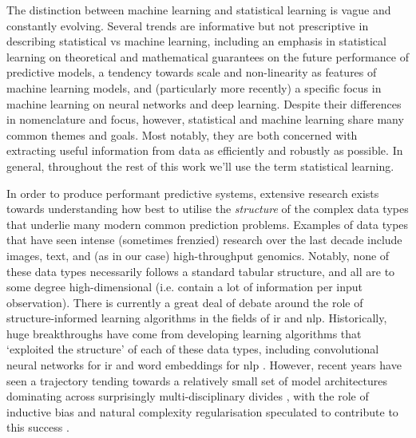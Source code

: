 \documentclass[thesis.tex]{subfiles}
\begin{document}
The distinction between machine learning and statistical learning is vague and constantly evolving. 
Several trends are informative but not prescriptive in describing statistical vs machine learning, including an emphasis in statistical learning on theoretical and mathematical guarantees on the future performance of predictive models, a tendency towards scale and non-linearity as features of machine learning models, and (particularly more recently) a specific focus in machine learning on neural networks and deep learning. Despite their differences in nomenclature and focus, however, statistical and machine learning share many common themes and goals. Most notably, they are both concerned with extracting useful information from data as efficiently and robustly as possible. In general, throughout the rest of this work we'll use the term statistical learning.

In order to produce performant predictive systems, extensive research exists towards understanding how best to utilise the \emph{structure} of the complex data types that underlie many modern common prediction problems. Examples of data types that have seen intense (sometimes frenzied) research over the last decade include images, text, and (as in our case) high-throughput genomics. Notably, none of these data types necessarily follows a standard tabular structure, and all are to some degree high-dimensional (i.e. contain a lot of information per input observation). There is currently a great deal of debate around the role of structure-informed learning algorithms in the fields of \gls{ir} and \gls{nlp}. Historically, huge breakthroughs have come from developing learning algorithms that `exploited the structure' of each of these data types, including convolutional neural networks for \gls{ir} \citep{krizhevsky_imagenet_2012, he_deep_2016, huang_densely_2018} and word embeddings for \gls{nlp} \citep{mikolov_efficient_2013, bojanowski_enriching_2017, almeida_word_2019}. However, recent years have seen a trajectory tending towards a relatively small set of model architectures dominating across surprisingly multi-disciplinary divides \citep{vaswani_attention_2017, dosovitskiy_image_2021}, with the role of inductive bias and natural complexity regularisation speculated to contribute to this success \citep{de_palma_random_2019, valle-perez_deep_2019, goldblum_no_2023}.
\end{document}
